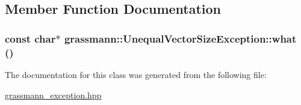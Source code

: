 \subsection{Member Function Documentation}
\hypertarget{classgrassmann_1_1UnequalVectorSizeException_5c31aa718f295dfb49955081a23364d3}{
\subsubsection[what]{\setlength{\rightskip}{0pt plus 5cm}const char$\ast$ grassmann::UnequalVectorSizeException::what ()}}
\label{classgrassmann_1_1UnequalVectorSizeException_5c31aa718f295dfb49955081a23364d3}




The documentation for this class was generated from the following file:\begin{CompactItemize}
\item 
\hyperlink{grassmann__exception_8hpp}{grassmann\_\-exception.hpp}\end{CompactItemize}
